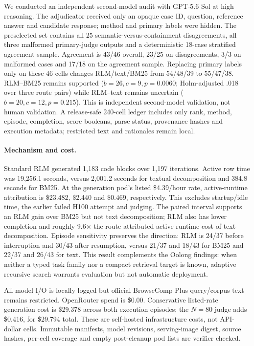 \documentclass[letterpaper]{article}
\begin{document}
We conducted an independent second-model audit with GPT-5.6 Sol at high reasoning. The adjudicator received only an opaque case ID, question, reference answer and candidate response; method and primary labels were hidden. The preselected set contains all 25 semantic-versus-containment disagreements, all three malformed primary-judge outputs and a deterministic 18-case stratified agreement sample. Agreement is 43/46 overall, 23/25 on disagreements, 3/3 on malformed cases and 17/18 on the agreement sample. Replacing primary labels only on these 46 cells changes RLM/text/BM25 from 54/48/39 to 55/47/38. RLM--BM25 remains supported ($b{=}26,c{=}9,p{=}0.0060$; Holm-adjusted .018 over three route pairs) while RLM--text remains uncertain ($b{=}20,c{=}12,p{=}0.215$). This is independent second-model validation, not human validation. A release-safe 240-cell ledger includes only rank, method, episode, completion, score booleans, parse status, provenance hashes and execution metadata; restricted text and rationales remain local.

\paragraph{Mechanism and cost.}
Standard RLM generated 1,183 code blocks over 1,197 iterations. Active row time was 19,256.1 seconds, versus 2,001.2 seconds for textual decomposition and 384.8 seconds for BM25. At the generation pod's listed \$4.39/hour rate, active-runtime attribution is \$23.482, \$2.440 and \$0.469, respectively. This excludes startup/idle time, the earlier failed H100 attempt and judging. The paired interval supports an RLM gain over BM25 but not text decomposition; RLM also has lower completion and roughly 9.6$\times$ the route-attributed active-runtime cost of text decomposition. Episode sensitivity preserves the direction: RLM is 24/37 before interruption and 30/43 after resumption, versus 21/37 and 18/43 for BM25 and 22/37 and 26/43 for text. This result complements the Oolong findings: when neither a typed task family nor a compact retrieval target is known, adaptive recursive search warrants evaluation but not automatic deployment.

All model I/O is locally logged but official BrowseComp-Plus query/corpus text remains restricted. OpenRouter spend is \$0.00. Conservative listed-rate generation cost is \$29.378 across both execution episodes; the $N=80$ judge adds \$0.416, for \$29.794 total. These are self-hosted infrastructure costs, not API-dollar cells. Immutable manifests, model revisions, serving-image digest, source hashes, per-cell coverage and empty post-cleanup pod lists are verifier checked.
\end{document}
